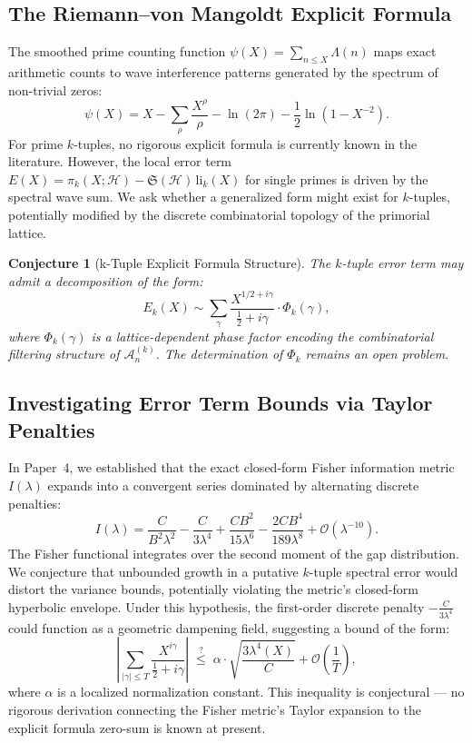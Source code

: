 \documentclass[11pt]{article}
\newtheorem{conjecture}[theorem]{Conjecture}
\theoremstyle{remark}
\begin{document}
\subsection{The Riemann--von Mangoldt Explicit Formula}
The smoothed prime counting function $\psi(X) = \sum_{n \le X} \Lambda(n)$ maps exact arithmetic counts to wave interference patterns generated by the spectrum of non-trivial zeros:
\begin{equation}
    \psi(X) = X - \sum_{\rho} \frac{X^\rho}{\rho} - \ln(2\pi) - \frac{1}{2}\ln(1 - X^{-2}).
\end{equation}
For prime $k$-tuples, no rigorous explicit formula is currently known in the literature. However, the local error term $E(X) = \pi_k(X; \mathcal{H}) - \mathfrak{S}(\mathcal{H})\,\mathrm{li}_k(X)$ for single primes is driven by the spectral wave sum. We ask whether a generalized form might exist for $k$-tuples, potentially modified by the discrete combinatorial topology of the primorial lattice.

\begin{conjecture}[k-Tuple Explicit Formula Structure]
The $k$-tuple error term may admit a decomposition of the form:
\begin{equation}
    E_k(X) \sim \sum_{\gamma} \frac{X^{1/2 + i\gamma}}{\frac{1}{2} + i\gamma} \cdot \Phi_k(\gamma),
\end{equation}
where $\Phi_k(\gamma)$ is a lattice-dependent phase factor encoding the combinatorial filtering structure of $\mathcal{A}_n^{(k)}$. The determination of $\Phi_k$ remains an open problem.
\end{conjecture}

\subsection{Investigating Error Term Bounds via Taylor Penalties}
In Paper~4, we established that the exact closed-form Fisher information metric $I(\lambda)$ expands into a convergent series dominated by alternating discrete penalties:
\begin{equation}
    I(\lambda) = \frac{C}{B^2 \lambda^2} - \frac{C}{3\lambda^4} + \frac{CB^2}{15\lambda^6} - \frac{2CB^4}{189\lambda^8} + \mathcal{O}(\lambda^{-10}).
\end{equation}
The Fisher functional integrates over the second moment of the gap distribution. We conjecture that unbounded growth in a putative $k$-tuple spectral error would distort the variance bounds, potentially violating the metric's closed-form hyperbolic envelope. Under this hypothesis, the first-order discrete penalty $-\frac{C}{3\lambda^4}$ could function as a geometric dampening field, suggesting a bound of the form:
\begin{equation}
    \left| \sum_{|\gamma| \le T} \frac{X^{i\gamma}}{\frac{1}{2} + i\gamma} \right| \; \stackrel{?}{\le}\; \alpha \cdot \sqrt{\frac{3\lambda^4(X)}{C}} + \mathcal{O}\!\left(\frac{1}{T}\right),
\end{equation}
where $\alpha$ is a localized normalization constant. This inequality is conjectural — no rigorous derivation connecting the Fisher metric's Taylor expansion to the explicit formula zero-sum is known at present.
\end{document}
